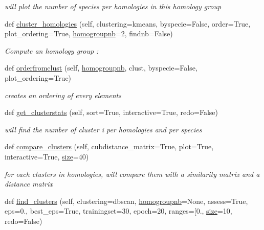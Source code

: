\begin{DoxyCompactItemize}
\begin{DoxyCompactList}\small\item\em will plot the number of species per homologies in this homology group \end{DoxyCompactList}\item 
def \mbox{\hyperlink{class_py_c_u_b_1_1homoset_1_1_homo_set_a2d543ce742d6a4e968e14b1471319287}{cluster\+\_\+homologies}} (self, clustering=\textquotesingle{}kmeans\textquotesingle{}, byspecie=False, order=True, plot\+\_\+ordering=True, \mbox{\hyperlink{class_py_c_u_b_1_1homoset_1_1_homo_set_a7e0bb4c43fb89bb5165f509048a5025b}{homogroupnb}}=2, findnb=False)
\begin{DoxyCompactList}\small\item\em Compute an homology group \+: \end{DoxyCompactList}\item 
def \mbox{\hyperlink{class_py_c_u_b_1_1homoset_1_1_homo_set_abebd6a9804b73a10fc726974630e5d26}{orderfromclust}} (self, \mbox{\hyperlink{class_py_c_u_b_1_1homoset_1_1_homo_set_a7e0bb4c43fb89bb5165f509048a5025b}{homogroupnb}}, clust, byspecie=False, plot\+\_\+ordering=True)
\begin{DoxyCompactList}\small\item\em creates an ordering of every elements \end{DoxyCompactList}\item 
def \mbox{\hyperlink{class_py_c_u_b_1_1homoset_1_1_homo_set_aa41e2430673cf29f96a522e03040ca1d}{get\+\_\+clusterstats}} (self, sort=True, interactive=True, redo=False)
\begin{DoxyCompactList}\small\item\em will find the number of cluster i per homologies and per species \end{DoxyCompactList}\item 
def \mbox{\hyperlink{class_py_c_u_b_1_1homoset_1_1_homo_set_ae429c30197127c5d6248c94dbb6dfc46}{compare\+\_\+clusters}} (self, cubdistance\+\_\+matrix=True, plot=True, interactive=True, \mbox{\hyperlink{class_py_c_u_b_1_1homoset_1_1_homo_set_a000511647e3f85d8abadcdddaddfb04d}{size}}=40)
\begin{DoxyCompactList}\small\item\em for each clusters in homologies, will compare them with a similarity matrix and a distance matrix \end{DoxyCompactList}\item 
def \mbox{\hyperlink{class_py_c_u_b_1_1homoset_1_1_homo_set_a81b40822ff0d1d3e0cfccd6c3c54cdd6}{find\+\_\+clusters}} (self, clustering=\textquotesingle{}dbscan\textquotesingle{}, \mbox{\hyperlink{class_py_c_u_b_1_1homoset_1_1_homo_set_a7e0bb4c43fb89bb5165f509048a5025b}{homogroupnb}}=None, assess=True, eps=0., best\+\_\+eps=True, trainingset=30, epoch=20, ranges=\mbox{[}0., \mbox{\hyperlink{class_py_c_u_b_1_1homoset_1_1_homo_set_a000511647e3f85d8abadcdddaddfb04d}{size}}=10, redo=False)

\end{DoxyCompactItemize}
